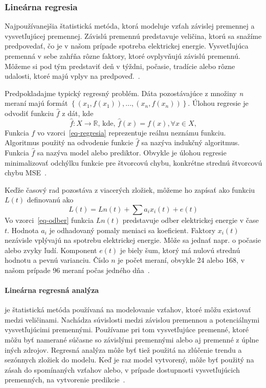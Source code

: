\documentclass[a4paper,slovak,12pt,appendix]{article}
\begin{document}

\subsubsection{Lineárna regresia}
Najpoužívanejšia štatistická metóda, ktorá modeluje vzťah závislej premennej
a vysvetľujúcej premennej. Závislú premennú predstavuje veličina, ktorú sa
snažíme predpovedať, čo je v našom prípade spotreba elektrickej energie.
Vysvetľujúca premenná v sebe zahŕňa rôzne faktory, ktoré ovplyvňujú závislú
premennú. Môžeme si pod tým predstaviť deň v týždni, počasie, tradície alebo rôzne
udalosti, ktoré majú vplyv na predpoveď.~\cite{KumarSingh2013, Mahalakshmi2016}.

Predpokladajme typický regresný problém. Dáta pozostávajúce z množiny \textit{n}
meraní majú formát $\left\{(x_1, f(x_1)), ..., (x_n, f(x_n))\right\}$.
Úlohou regresie je odvodiť funkciu $\hat{f}$ z dát, kde
\begin{equation}
  \hat{f} : X \to \mathbb{R} \text{, kde, } \hat{f}(x) = f(x), \forall x \in X,
  \label{eq-regresia}
\end{equation}
Funkcia $f$ vo vzorci~\ref{eq-regresia} reprezentuje reálnu neznámu
funkciu. Algoritmus použitý na odvodenie funkcie $\hat{f}$ sa nazýva
indukčný algoritmus. Funkcia $\hat{f}$ sa nazýva model alebo
prediktor. Obvykle je úlohou regresie minimalizovať odchýlku funkcie pre
štvorcovú chybu, konkrétne strednú štvorcovú chybu MSE~\cite{Mendes-Moreira2012}.

Keďže časový rad pozostáva z viacerých zložiek, môžeme ho zapísať ako funkciu
$L(t)$ definovanú ako
\begin{equation}
  L(t) = Ln(t) + \sum a_i x_i(t) + e(t)
  \label{eq-odber}
\end{equation}
Vo vzorci~\ref{eq-odber} funkcia $Ln(t)$ predstavuje odber elektrickej energie
v čase $t$. Hodnota $a_i$ je odhadovaný pomaly meniaci sa koeficient. Faktory
$x_i(t)$ nezávisle vplývajú na spotrebu elektrickej energie. Môže sa jednať
napr. o počasie alebo zvyky ľudí. Komponent $e(t)$ je biely šum, ktorý má nulovú
strednú hodnotu a pevnú varianciu. Číslo $n$ je počet meraní, obvykle 24
alebo 168, v našom prípade 96 meraní počas jedného dňa~\cite{KumarSingh2013}.

\paragraph{Lineárna regresná analýza} je štatistická metóda používaná na
modelovanie vzťahov, ktoré môžu existovať medzi veličinami. Nachádza súvislosti
medzi závislou premennou a potenciálnymi vysvetľujúcimi premennými. Používame
pri tom vysvetľujúce premenné, ktoré môžu byť namerané súčasne so závislými
premennými alebo aj premenné z úplne iných zdrojov. Regresná analýza môže byť
tiež použitá na zlúčenie trendu a sezónnych zložiek do modelu. Keď je raz model
vytvorený, môže byť použitý na zásah do spomínaných vzťahov alebo, v prípade
dostupnosti vysvetľujúcich premenných, na vytvorenie predikcie~\cite{Liu1992}.
\end{document}
